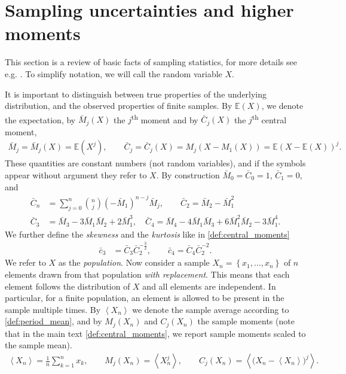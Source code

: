 \documentclass[11pt,a4paper]{article}
\renewcommand{\|}{\rule[-0.4ex]{0.2ex}{1.2em}}
\begin{document}
\section{Sampling uncertainties and higher moments}\label{sec:sampling_uncertainty}

This section is a review of basic facts of sampling statistics, for more details see e.g.  \cite{shenton_development_1975,davison_bootstrap_1997,tille_sampling_2020,evans_probability_2023}. To simplify notation, we will call the random variable $X$. 

It is important to distinguish between true properties of the underlying distribution, and the observed properties of finite samples. By $\mathbb E(X)$, we denote the  expectation,  by $\bar M_j(X)$ the   $j$\textsuperscript{th} moment and by $\bar C_j(X)$ the   $j$\textsuperscript{th}  central moment,
\begin{align*}
	\bar M_j=\bar M_j(X) = \mathbb{E}\left( X^j \right)  , \qquad \bar C_j =\bar C_j(X)=  M_j \left( X-M_1(X) \right)  = \mathbb E \left( X -\mathbb E(X)\right) ^j.
\end{align*}
These quantities are constant numbers (not random variables), and if the symbols appear without argument they refer to  $X$. 
By construction $\bar M_0 = \bar C_0=1$, $\bar C_1=0$, and
\begin{align}\label{moments_central_moments}
	\bar C_n &= \sum_{j=0}^n \binom n j (- \bar M_1)^{n-j} \bar M_j, \qquad \bar C_2  = \bar M_2-\bar M_1^2\\
	  \bar C_3 &= \bar M_3 - 3 \bar M_1 \bar M_2 + 2 \bar M_1^3, \quad \bar C_4 = \bar M_4 - 4 \bar M_1 \bar M_3 + 6 \bar M_1^2 \bar M_2 - 3 \bar M_1^4.\nonumber 
\end{align}
We further define the \emph{skewness} and the \emph{kurtosis} like in \cref{def:central_moments}
\begin{align}\label{def:skewness_kurtosis}
	\bar c_3 &= \bar C_3 \bar C_2^{-\frac 3 2}, \qquad \bar c_4 = \bar C_4 \bar C_2^{-2}.
\end{align}
We refer to $X$ as the \emph{population}. 
Now consider a sample $X_n=\left \lbrace x_1, \ldots, x_n \right \rbrace $ of $n$ elements drawn from that population \emph{with replacement}. This means that each element follows the distribution of $X$ and all elements are independent. In particular, for a finite population, an element is allowed to be present in the sample multiple times.  By $\left \langle X_n \right \rangle $ we denote the sample average according to \cref{def:period_mean}, and by $M_j(X_n)$ and $C_j(X_n)$ the sample moments (note that in the main text \cref{def:central_moments}, we report sample moments scaled to the sample mean).
\begin{align}\label{def:sample_mean}
	\left \langle X_n \right \rangle = \frac 1 n \sum_{k=1}^n x_k, \qquad M_j(X_n) = \left \langle X_n^j \right \rangle , \qquad C_j(X_n) =  \left \langle \big(X_n- \left \langle X_n \right \rangle  \big)^j \right \rangle  .
\end{align}
\end{document}
